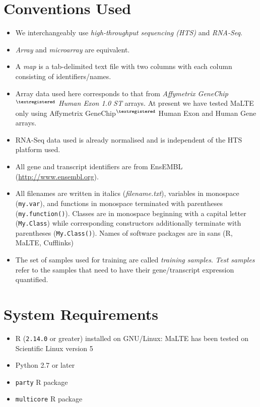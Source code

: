 \documentclass[a4paper,12pt]{article}
\begin{document}
\section{Conventions Used}
\label{conventions}
\begin{itemize}
\item We interchangeably use \textit{high-throughput sequencing (HTS)} and \textit{RNA-Seq}.
\item \textit{Array} and \textit{microarray} are equivalent.
\item A \textit{map} is a tab-delimited text file with two columns with each column consisting of identifiers/names.
\item Array data used here corresponds to that from \textit{Affymetrix GeneChip$^{\textregistered}$ Human Exon 1.0 ST} arrays. At present we have tested \textsf{MaLTE} only using Affymetrix GeneChip$^{\textregistered}$ Human Exon and Human Gene arrays.
\item RNA-Seq data used is already normalised and is independent of the HTS platform used.
\item All gene and transcript identifiers are from EnsEMBL (\url{http://www.ensembl.org}).
\item All filenames are written in italics (\textit{filename.txt}), variables in monospace (\texttt{my.var}), and functions in monospace terminated with parentheses (\texttt{my.function()}). Classes are in monospace beginning with a capital letter (\texttt{My.Class}) while corresponding constructors additionally terminate with parentheses (\texttt{My.Class()}). Names of software packages are in sans (\textsf{R}, \textsf{MaLTE}, \textsf{Cufflinks})
\item The set of samples used for training are called \textit{training samples}. \textit{Test samples} refer to the samples that need to have their gene/transcript expression quantified.
\end{itemize}

\section{System Requirements}
\label{system}
\begin{itemize}
\item \textsf{R} (\texttt{2.14.0} or greater) installed on GNU/Linux: \textsf{MaLTE} has been tested on Scientific Linux version 5
\item \textsf{Python} 2.7 or later
\item \texttt{party} \textsf{R} package
\item \texttt{multicore} \textsf{R} package
\end{itemize}
\end{document}
